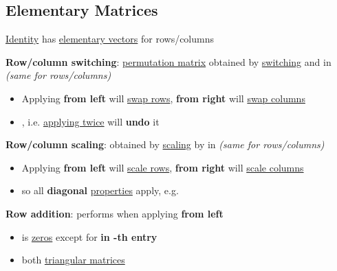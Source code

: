 \subsection*{Elementary Matrices}

\underline{Identity}
has \underline{elementary vectors} 
for rows/columns

\textbf{Row/column switching}: \underline{permutation matrix} 
obtained by \underline{switching}  and
 in  \emph{(same for rows/columns)}
\begin{itemize}

      \item
            Applying  \textbf{from left} will \underline{swap rows},
            \textbf{from right} will \underline{swap columns}
      \item
            , i.e. \underline{applying twice}
            will \textbf{undo} it
\end{itemize}

\textbf{Row/column scaling}:  obtained by \underline{scaling}  by \iMbox{\lambda} in
 \emph{(same for rows/columns)}
\begin{itemize}
      \item
            Applying  \textbf{from left} will \underline{scale rows},
            \textbf{from right} will \underline{scale columns}
      \item
            so all \textbf{diagonal} \underline{properties} apply,
            e.g. 
\end{itemize}

\textbf{Row addition}:
performs  when
applying \textbf{from left}
\begin{itemize}

      \item
             is \underline{zeros} except
            for \textbf{\iMbox{\lambda} in -th entry}
      \item
             both \underline{triangular matrices}
\end{itemize}


